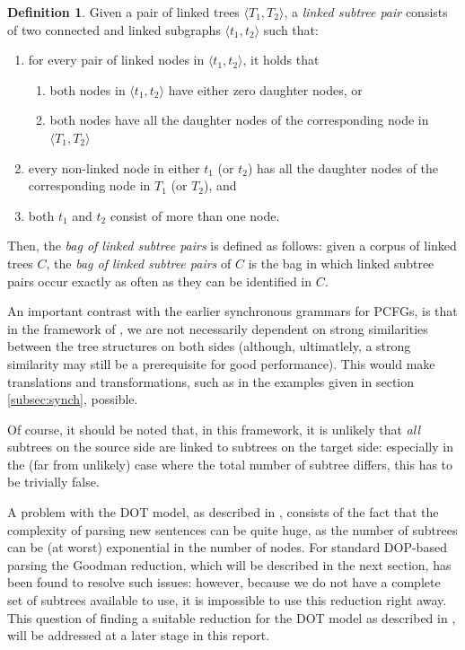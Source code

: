 \documentclass[a4paper]{article}
\theoremstyle{definition}
\newtheorem{definition}[theorem]{Definition}
\begin{document}
\begin{definition}
Given a pair of linked trees $\langle T_1, T_2 \rangle$, a \emph{linked subtree
pair} consists of two connected and linked subgraphs $\langle t_1, t_2 \rangle$
such that:

\begin{enumerate}
\item for every pair of linked nodes in $\langle t_1, t_2 \rangle$, it holds that
	\begin{enumerate}
	\item both nodes in $\langle t_1, t_2 \rangle$ have either zero
		daughter nodes, or
	\item both nodes have all the daughter nodes of the corresponding node
		in $\langle T_1, T_2 \rangle$
	\end{enumerate}
\item every non-linked node in either $t_1$ (or $t_2$) has all the daughter
	nodes of the corresponding node in $T_1$ (or $T_2$), and
\item both $t_1$ and $t_2$ consist of more than one node.
\end{enumerate}
\end{definition}

Then, the \emph{bag of linked subtree pairs} is defined as follows: given a
corpus of linked trees $C$, the \emph{bag of linked subtree pairs} of $C$ is
the bag in which linked subtree pairs occur exactly as often as they can be
identified in $C$.

An important contrast with the earlier synchronous grammars for PCFGs, is that
in the framework of \citet{poutsma2000coling}, we are not necessarily dependent
on strong similarities between the tree structures on both sides (although,
ultimatlely, a strong similarity may still be a prerequisite for good
performance). This would make translations and transformations, such as in the
examples given in section \ref{subsec:synch}, possible.

Of course, it should be noted that, in this framework, it is unlikely that
\emph{all} subtrees on the source side are linked to subtrees on the target
side: especially in the (far from unlikely) case where the total number of
subtree differs, this has to be trivially false.

A problem with the DOT model, as described in \citet{poutsma2000coling},
consists of the fact that the complexity of parsing new sentences can be quite
huge, as the number of subtrees can be (at worst) exponential in the number of
nodes. For standard DOP-based parsing the Goodman reduction, which will be
described in the next section, has been found to resolve such issues: however,
because we do not have a complete set of subtrees available to use, it is
impossible to use this reduction right away. This question of finding a
suitable reduction for the DOT model as described in \citet{poutsma2000msc,
poutsma2000coling}, will be addressed at a later stage in this report.
\end{document}
